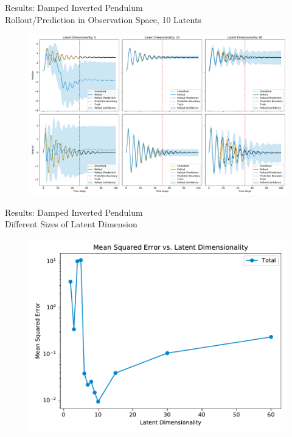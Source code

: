\documentclass[
	aspectratio=43,
	color={accentcolor=1c},
	logo=false,
	colorframetitle=true,
]{tudabeamer}
\begin{document}
			\begin{frame}{Results: Damped Inverted Pendulum \\ Rollout/Prediction in Observation Space, 10 Latents}
				\vspace{-0.4cm}
				\begin{figure}
					\centering
					\includegraphics[height = 0.8\textheight]{figures/results/latent-dimensions-experiment_rollout}
				\end{figure}
			\end{frame}

			\begin{frame}{Results: Damped Inverted Pendulum \\ Different Sizes of Latent Dimension}
				\vspace{-0.4cm}
				\begin{figure}
					\centering
					\includegraphics[height = 0.8\textheight]{figures/results/latent-dimensions-experiment_mse}
				\end{figure}
			\end{frame}
\end{document}
